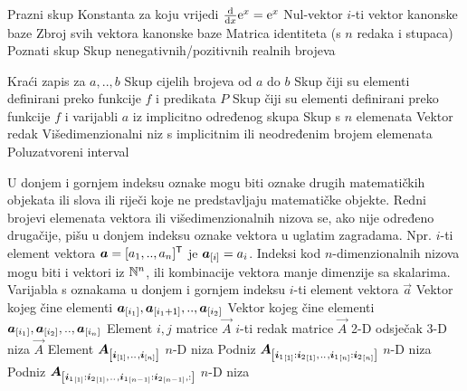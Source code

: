	{Prazni skup}
	{Konstanta za koju vrijedi $\od{}{x}\const e^x=\const e^x$}
	{Nul-vektor}
	{$i$-ti vektor kanonske baze}
	{Zbroj svih vektora kanonske baze}
	{Matrica identiteta (s $n$ redaka i stupaca)}
	{Poznati skup}
	{Skup nenegativnih/pozitivnih realnih brojeva}

	{Kraći zapis za $a,..,b$}
	{Skup cijelih brojeva od $a$ do $b$}
	{Skup čiji su elementi definirani preko funkcije $f$ i predikata $P$}
	{Skup čiji su elementi definirani preko funkcije $f$ i varijabli $a$ iz implicitno određenog skupa}
	{Skup s $n$ elemenata}
	{Vektor redak}
	{Višedimenzionalni niz s implicitnim ili neodređenim brojem elemenata}
	{Poluzatvoreni interval}

{U donjem i gornjem indeksu oznake mogu biti oznake drugih matematičkih objekata ili slova ili riječi koje ne predstavljaju matematičke objekte. Redni brojevi elemenata vektora ili višedimenzionalnih nizova se, ako nije određeno drugačije, pišu u donjem indeksu oznake vektora u uglatim zagradama. Npr. $i$-ti element vektora $\vec a=\sbr{a_1,.., a_n}^\tp$ je $\vec a_\ind{i}=a_i$. Indeksi kod $n$-dimenzionalnih nizova mogu biti i vektori iz $\mathbb{N}^{n}$, ili kombinacije vektora manje dimenzije sa skalarima.}
	{Varijabla s oznakama u donjem i gornjem indeksu}
	{$i$-ti element vektora $\vec{a}$}
	{Vektor kojeg čine elementi $\vec{a}_\ind{i_1}, \vec{a}_\ind{i_1+1},.., \vec{a}_{\sbr{i_2}}$}
	{Vektor kojeg čine elementi $\vec{a}_\ind{i_1}, \vec{a}_\ind{i_2},.., \vec{a}_{\sbr{i_n}}$}
	{Element $i,j$ matrice $\vec A$}
	{$i$-ti redak matrice $\vec A$}
	{2-D odsječak 3-D niza $\vec A$}
	{Element $\vec{A}_\ind{\vec i_\ind{1},\bidot,\vec i_\ind{n}}$ $n$-D niza}
	{Podniz $\vec{A}_\ind{{\vec i_1}_\ind{1}:{\vec i_2}_\ind{1},\bidot,{\vec i_1}_\ind{n}:{\vec i_2}_\ind{n}}$ $n$-D niza}
	{Podniz $\vec{A}_\ind{{\vec i_1}_\ind{1}:{\vec i_2}_\ind{1},\bidot,{\vec i_1}_\ind{n-1}:{\vec i_2}_\ind{n-1},:}$ $n$-D niza}

